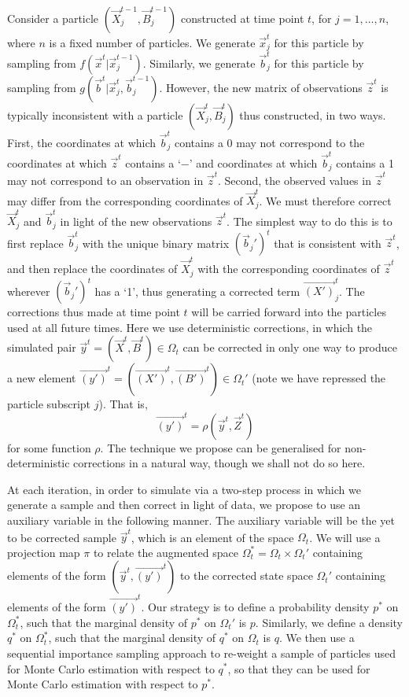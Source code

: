 Consider a particle $(\vec{X}^{t-1}_j,\vec{B}^{t-1}_j)$ constructed at time point $t$, for $j = 1, \ldots, n$, where $n$ is a fixed number of particles. We generate $\vec{x}^t_j$ for this particle by sampling from $f(\vec{x}^t | \vec{x}^{t-1}_j)$. Similarly, we generate $\vec{b}^{t}_j$ for this particle by sampling from $g(\vec{b}^{t} | \vec{x}^t_j, \vec{b}^{t-1}_j)$. However, the new matrix of observations $\vec{z}^{t}$ is typically inconsistent with a particle $(\vec{X}^{t}_j, \vec{B}^{t}_j)$ thus constructed, in two ways. First, the coordinates at which $\vec{b}^{t}_j$ contains a 0 may not correspond to the coordinates at which $\vec{z}^{t}$ contains a `$-$' and coordinates at which $\vec{b}^{t}_j$ contains a 1 may not correspond to an observation in $\vec{z}^{t}$. Second, the observed values in $\vec{z}^{t}$ may differ from the corresponding coordinates of $\vec{X}^{t}_j$. We must therefore correct $\vec{X}^{t}_j$ and $\vec{b}^{t}_j$ in light of the new observations $\vec{z}^{t}$. The simplest way to do this is to first replace $\vec{b}^{t}_j$ with the unique binary matrix $(\vec{b}_j')^{t}$ that is consistent with $\vec{z}^{t}$, and then replace the coordinates of $\vec{X}^{t}_j$ with the corresponding coordinates of $\vec{z}^{t}$ wherever $(\vec{b}_j')^{t}$ has a `1', thus generating a corrected term $\vec{(X')}^{t}_j$. The corrections thus made at time point $t$ will be carried forward into the particles used at all future times. Here we use deterministic corrections, in which the simulated pair $\vec{y}^{t} = (\vec{X}^{t}, \vec{B}^{t}) \in \Omega_t$ can be corrected in only one way to produce a new element $\vec{(y')}^{t} = (\vec{(X')}^t, \vec{(B')}^t) \in \Omega_t'$ (note we have repressed the particle subscript $j$). That is, 
\[
\vec{(y')}^{t} = \rho(\vec{y}^{t},\vec{Z}^{t})
\]
for some function $\rho$. The technique we propose can be generalised for non-deterministic corrections in a natural way, though we shall not do so here.

At each iteration, in order to simulate via a two-step process in which we generate a sample and then correct in light of data, we propose to use an auxiliary variable in the following manner. The auxiliary variable will be the yet to be corrected sample $\vec{y}^{t}$, which is an element of the space $\Omega_t$. We will use a projection map $\pi$ to relate the augmented space $\Omega^*_t = \Omega_t \times \Omega_t'$ containing elements of the form $(\vec{y}^{t}, \vec{(y')}^{t})$ to the corrected state space $\Omega_t'$ containing elements of the form $\vec{(y')}^{t}$. Our strategy is to define a probability density $p^*$ on $\Omega^*_t$, such that the marginal density of $p^*$ on $\Omega_t'$ is $p$. Similarly, we define a density $q^*$ on $\Omega^*_t$, such that the marginal density of $q^*$ on $\Omega_t$ is $q$. We then use a sequential importance sampling approach to re-weight a sample of particles used for Monte Carlo estimation with respect to $q^*$, so that they can be used for Monte Carlo estimation with respect to $p^*$.

